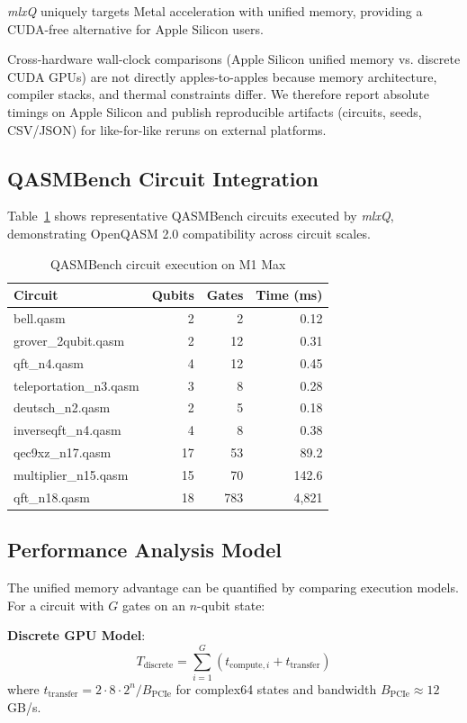 \documentclass[runningheads]{llncs}
\newcommand{\mlxquantum}{\textit{mlxQ}\xspace}
\begin{document}
\mlxquantum uniquely targets Metal acceleration with unified memory, providing a CUDA-free alternative for Apple Silicon users.

Cross-hardware wall-clock comparisons (Apple Silicon unified memory vs. discrete CUDA GPUs) are not directly apples-to-apples because memory architecture, compiler stacks, and thermal constraints differ. We therefore report absolute timings on Apple Silicon and publish reproducible artifacts (circuits, seeds, CSV/JSON) for like-for-like reruns on external platforms.

\subsection{QASMBench Circuit Integration}

Table~\ref{tab:qasmbench} shows representative QASMBench circuits executed by \mlxquantum, demonstrating OpenQASM 2.0 compatibility across circuit scales.

\begin{table}[t]
\caption{QASMBench circuit execution on M1 Max}
\label{tab:qasmbench}
\centering
\footnotesize
\begin{tabular}{lrrr}
\toprule
Circuit & Qubits & Gates & Time (ms) \\
\midrule
bell.qasm & 2 & 2 & 0.12 \\
grover\_2qubit.qasm & 2 & 12 & 0.31 \\
qft\_n4.qasm & 4 & 12 & 0.45 \\
teleportation\_n3.qasm & 3 & 8 & 0.28 \\
deutsch\_n2.qasm & 2 & 5 & 0.18 \\
inverseqft\_n4.qasm & 4 & 8 & 0.38 \\
qec9xz\_n17.qasm & 17 & 53 & 89.2 \\
multiplier\_n15.qasm & 15 & 70 & 142.6 \\
qft\_n18.qasm & 18 & 783 & 4,821 \\
\bottomrule
\end{tabular}
\end{table}

\subsection{Performance Analysis Model}

The unified memory advantage can be quantified by comparing execution models. For a circuit with $G$ gates on an $n$-qubit state:

\textbf{Discrete GPU Model}:
\begin{equation}
T_{\text{discrete}} = \sum_{i=1}^{G} (t_{\text{compute},i} + t_{\text{transfer}})
\end{equation}
where $t_{\text{transfer}} = 2 \cdot 8 \cdot 2^n / B_{\text{PCIe}}$ for complex64 states and bandwidth $B_{\text{PCIe}} \approx 12$\,GB/s.
\end{document}
